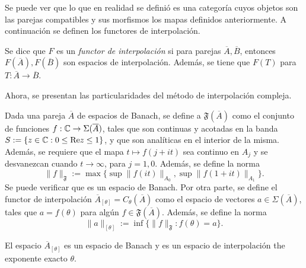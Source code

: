 \begin{remark}
	Se puede ver que lo que en realidad se definió es una categoría cuyos objetos son las parejas compatibles y sus morfismos los mapas definidos anteriormente. A continuación se definen los functores de interpolación.
\end{remark}
\begin{definition}
	Se dice que $F$ es un \textit{functor de interpolación} si para parejas $\overline{A}, \overline{B}$, entonces $F(\overline{A}), F(\overline{B})$ son espacios de interpolación. Además, se tiene que $F(T)$ para $T:\overline{A}\to\overline{B}$.
\end{definition}
Ahora, se presentan las particularidades del método de interpolación compleja.
\begin{definition}
	Dada una pareja $\overline{A}$ de espacios de Banach, se define a $\mathfrak{F}(\overline{A})$ como el conjunto de funciones $f:\mathbb{C}\to\Sigma(\overline{A})$, tales que son continuas y acotadas en la banda $S:=\{z\in\mathbb{C} : 0\leq\mathrm{Re} z\leq1\}$, y que son analíticas en el interior de la misma. Además, se requiere que el mapa $t\mapsto f(j+it)$ sea continuo en $A_j$ y se desvanezcan cuando $t\to\infty$, para $j=1,0$. Además, se define la norma 
	\begin{equation*}
		\|f\|_{\mathfrak{F}} := \max\{\sup\|f(it)\|_{A_0}, \sup\|f(1+it)\|_{A_1}\}.
	\end{equation*}
	Se puede verificar que es un espacio de Banach. Por otra parte, se define el functor de interpolación $\overline{A}_{[\theta]}=C_\theta(\overline{A})$ como el espacio de vectores $a\in\Sigma(\overline{A})$, tales que $a=f(\theta)$ para algún $f\in \mathfrak{F}(\overline{A})$. Además, se define la norma
	\begin{equation*}
		\|a\|_{[\theta]} := \inf \{\|f\|_{\mathfrak{F}} : f(\theta) = a\}.
	\end{equation*}
\end{definition}
\begin{theorem}
	El espacio $\overline{A}_{[\theta]}$ es un espacio de Banach y es un espacio de interpolación the exponente exacto $\theta$.
\end{theorem}
